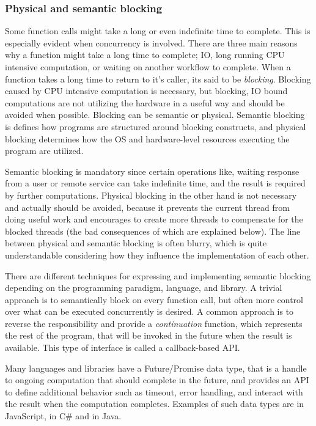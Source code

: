 \subsubsection{Physical and semantic blocking}
Some function calls might take a long or even indefinite time to complete. This is especially evident when concurrency is involved. There are three main reasons why a function might take a long time to complete; IO, long running CPU intensive computation, or waiting on another workflow to complete. When a function takes a long time to return to it's caller, its said to be \textit{blocking}. Blocking caused by CPU intensive computation is necessary, but blocking, IO bound computations are not utilizing the hardware in a useful way and should be avoided when possible. Blocking can be semantic or physical. Semantic blocking is defines how programs are structured around blocking constructs, and physical blocking determines how the OS and hardware-level resources executing the program are utilized.

Semantic blocking is mandatory since certain operations like, waiting response from a user or remote service can take indefinite time, and the result is required by further computations. Physical blocking in the other hand is not necessary and actually should be avoided, because it prevents the current thread from doing useful work and encourages to create more threads to compensate for the blocked threads (the bad consequences of which are explained below). The line between physical and semantic blocking is often blurry, which is quite understandable considering how they influence the implementation of each other.

There are different techniques for expressing and implementing semantic blocking depending on the programming paradigm, language, and library. A trivial approach is to semantically block on every function call, but often more control over what can be executed concurrently is desired. A common approach is to reverse the responsibility and provide a \textit{continuation} function, which represents the rest of the program, that will be invoked in the future when the result is available. This type of interface is called a callback-based API.

Many languages and libraries have a Future/Promise data type, that is a handle to ongoing computation that should complete in the future, and provides an API to define additional behavior such as timeout, error handling, and interact with the result when the computation completes. Examples of such data types are  in JavaScript,  in C\# and  in Java.

